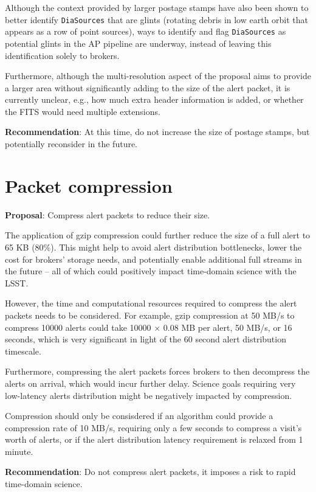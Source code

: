 \documentclass[DM,authoryear,toc]{lsstdoc}
\begin{document}
Although the context provided by larger postage stamps have also been shown to better identify \texttt{DiaSources} that are glints
(rotating debris in low earth orbit that appears as a row of point sources), ways to identify and flag \texttt{DiaSources}
as potential glints in the AP pipeline are underway, instead of leaving this identification solely to brokers.

Furthermore, although the multi-resolution aspect of the proposal aims to provide a larger area without significantly
adding to the size of the alert packet, it is currently unclear, e.g., how much extra header information is added, or whether the
FITS would need multiple extensions.

\textbf{Recommendation}: At this time, do not increase the size of postage stamps, but potentially reconsider in the future.


\section{Packet compression}\label{sec:compression}

\textbf{Proposal}: Compress alert packets to reduce their size.

The application of gzip compression could further reduce the size of a full alert to 65 KB (80\%).
This might help to avoid alert distribution bottlenecks, lower the cost for brokers' storage needs, and potentially enable 
additional full streams in the future -- all of which could positively impact time-domain science with the LSST.

However, the time and computational resources required to compress the alert packets needs to be considered.
For example, gzip compression at 50 MB/s to compress 10000 alerts could take 10000 $\times$ 0.08 MB per alert, 50 MB/s, or 
16 seconds, which is very significant in light of the 60 second alert distribution timescale. 

Furthermore, compressing the alert packets forces brokers to then decompress the alerts on arrival, which would incur further delay.
Science goals requiring very low-latency alerts distribution might be negatively impacted by compression.

Compression should only be consisdered if an algorithm could provide a compression rate of 10 MB/s, requiring only a few seconds 
to compress a visit's worth of alerts, or if the alert distribution latency requirement is relaxed from 1 minute.

\textbf{Recommendation}: Do not compress alert packets, it imposes a risk to rapid time-domain science.
\end{document}
